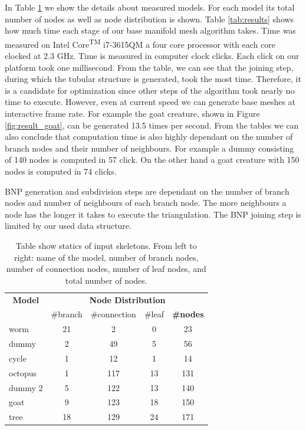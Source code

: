 In Table \ref{tab:models} we show the details about measured models.
For each model its total number of nodes as well as node distribution is shown.
Table \ref{tab:results} shows how much time each stage of our base manifold mesh algorithm takes.
Time was measured on Intel\textsuperscript{\textregistered}  Core\textsuperscript{TM} i7-3615QM a four core processor with each core clocked at 2.3 GHz.
Time is measured in computer clock clicks.
Each click on our platform took one millisecond.
From the table, we can see that the joining step, during which the tubular structure is generated, took the most time.
Therefore, it is a candidate for optimization since other steps of the algorithm took nearly no time to execute.
However, even at current speed we can generate base meshes at interactive frame rate.
For example the goat creature, shown in Figure \ref{fig:result_goat}, can be generated 13.5 times per second.
From the tables we can also conclude that computation time is also highly dependant on the number of branch nodes and their number of neighbours.
For example a dummy consisting of 140 nodes is computed in 57 click.
On the other hand a goat creature with 150 nodes is computed in 74 clicks.

BNP generation and subdivision steps are dependant on the number of branch nodes and number of neighbours of each branch node.
The more neighbours a node has the longer it takes to execute the triangulation.
The BNP joining step is limited by our used data structure.


\begin{table}[h]
\centering
\begin{tabular}{l|ccc||c}\hline
\multicolumn{1}{c}{\textbf{Model}} & \multicolumn{4}{c}{\textbf{Node Distribution}} \\
   & \#branch & \#connection & \#leaf & \textbf{\#nodes} \\ \hline
  worm & 21 & 2 & 0 & 23 \\
  dummy & 2 & 49 & 5 & 56 \\
  cycle & 1 & 12 & 1 & 14 \\
  octopus & 1 & 117 & 13 & 131 \\
  dummy 2 & 5 & 122 & 13 & 140 \\
  goat & 9 & 123 & 18 & 150 \\
  tree & 18 & 129 & 24 & 171 \\ \hline
\end{tabular}
\caption{Table show statics of input skeletons. From left to right: name of the model, number of branch nodes, number of connection nodes, number of leaf nodes, and total number of nodes.}
\label{tab:models}
\end{table}


